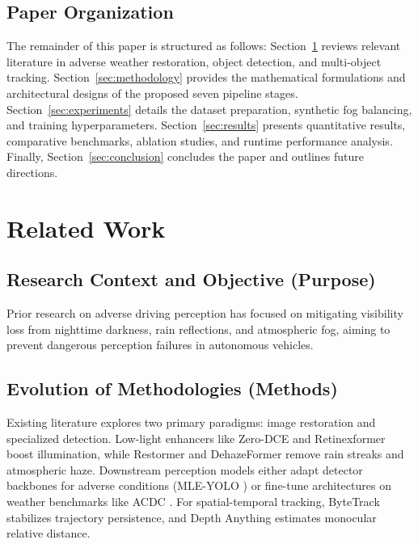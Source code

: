 \documentclass[conference]{IEEEtran}
\begin{document}
\subsection{Paper Organization}
The remainder of this paper is structured as follows: Section~\ref{sec:related_work} reviews relevant literature in adverse weather restoration, object detection, and multi-object tracking. Section~\ref{sec:methodology} provides the mathematical formulations and architectural designs of the proposed seven pipeline stages. Section~\ref{sec:experiments} details the dataset preparation, synthetic fog balancing, and training hyperparameters. Section~\ref{sec:results} presents quantitative results, comparative benchmarks, ablation studies, and runtime performance analysis. Finally, Section~\ref{sec:conclusion} concludes the paper and outlines future directions.

\section{Related Work}
\label{sec:related_work}

\subsection{Research Context and Objective (Purpose)}
Prior research on adverse driving perception has focused on mitigating visibility loss from nighttime darkness, rain reflections, and atmospheric fog, aiming to prevent dangerous perception failures in autonomous vehicles.

\subsection{Evolution of Methodologies (Methods)}
Existing literature explores two primary paradigms: image restoration and specialized detection. Low-light enhancers like Zero-DCE \cite{guo2020zero} and Retinexformer \cite{cai2023retinexformer} boost illumination, while Restormer \cite{zamir2022restormer} and DehazeFormer \cite{song2023dehazeformer} remove rain streaks and atmospheric haze. Downstream perception models either adapt detector backbones for adverse conditions (MLE-YOLO \cite{du2026mleyolo}) or fine-tune architectures on weather benchmarks like ACDC \cite{sakaridis2021acdc}. For spatial-temporal tracking, ByteTrack \cite{zhang2022bytetrack} stabilizes trajectory persistence, and Depth Anything \cite{yang2024depth} estimates monocular relative distance.
\end{document}
